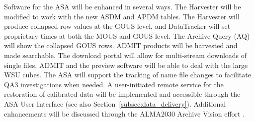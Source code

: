 Software for the \acf{ASA} will be enhanced in several ways. The Harvester will be modified to work with the new \ac{ASDM} and \ac{APDM} tables. The Harvester will produce collapsed row values at the GOUS level, and DataTracker will set proprietary times at both the MOUS and GOUS level. The Archive Query (AQ) will show the collapsed GOUS rows. \ac{ADMIT} products will be harvested and made searchable. The download portal will allow for multi-stream downloads of single files. \ac{ADMIT} and the preview software will be able to deal with the large WSU cubes. The \ac{ASA} will support the tracking of name file changes to facilitate QA3 investigations when needed. 
A user-initiated remote service for the restoration of calibrated data  will be implemented and accessible through the ASA User Interface (see also Section~\ref{subsec:data_delivery}). 
Additional enhancements will be discussed through the ALMA2030 Archive Vision effort \cite{2030_archive_vision}.


\newpage